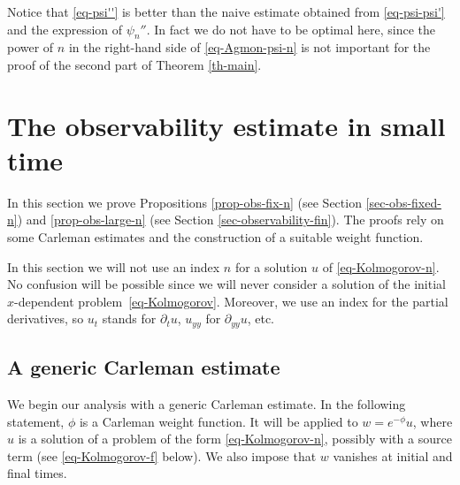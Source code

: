 \documentclass[11pt]{article}
\numberwithin{equation}{section}
\theoremstyle{plain}
\theoremstyle{definition}
\newcommand{\1}{\mathds 1}
\let\vf\phi
\begin{document}
Notice that \eqref{eq-psi''} is better than the naive estimate obtained from \eqref{eq-psi-psi'} and the expression of $\psi_n''$. In fact we do not have to be optimal here, since the power of $n$ in the right-hand side of \eqref{eq-Agmon-psi-n} is not important for the proof of the second part of Theorem \ref{th-main}.

\section{The observability estimate in small time} \label{sec-Carleman}

In this section we prove Propositions \ref{prop-obs-fix-n} (see Section \ref{sec-obs-fixed-n}) and \ref{prop-obs-large-n} (see Section \ref{sec-observability-fin}). The proofs rely on some Carleman estimates and the construction of a suitable weight function.

In this section we will not use an index $n$ for a solution $u$ of \eqref{eq-Kolmogorov-n}. No confusion will be possible since we will never consider a solution of the initial $x$-dependent problem~\eqref{eq-Kolmogorov}. Moreover, we use an index for the partial derivatives, so $u_t$ stands for $\partial_t u$, $u_{yy}$ for $\partial_{yy} u$, etc.

\subsection{A generic Carleman estimate}

We begin our analysis with a generic Carleman estimate. In the following statement, $\vf$ is a Carleman weight function. It will be applied to $w = e^{-\vf} u$, where $u$ is a solution of a problem of the form \eqref{eq-Kolmogorov-n}, possibly with a source term (see \eqref{eq-Kolmogorov-f} below). We also impose that $w$ vanishes at initial and final times.
\end{document}
